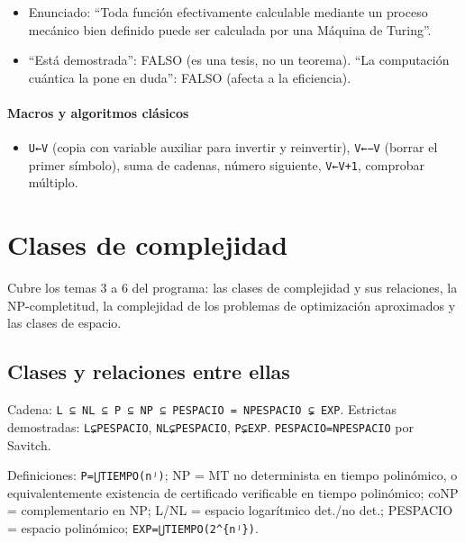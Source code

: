 \documentclass[12pt]{book} %
\providecommand{\tightlist}{%
  \setlength{\itemsep}{0pt}\setlength{\parskip}{0pt}}
\begin{document}
\begin{itemize}
\tightlist
\item
  Enunciado: ``Toda función efectivamente calculable mediante un proceso
  mecánico bien definido puede ser calculada por una Máquina de
  Turing''.
\item
  ``Está demostrada'': FALSO (es una tesis, no un teorema). ``La
  computación cuántica la pone en duda'': FALSO (afecta a la
  eficiencia).
\end{itemize}

\hypertarget{macros-y-algoritmos-cluxe1sicos}{%
\subsubsection{Macros y algoritmos
clásicos}\label{macros-y-algoritmos-cluxe1sicos}}

\begin{itemize}
\tightlist
\item
  \texttt{U←V} (copia con variable auxiliar para invertir y reinvertir),
  \texttt{V←−V} (borrar el primer símbolo), suma de cadenas, número
  siguiente, \texttt{V←V+1}, comprobar múltiplo.
\end{itemize}

\hypertarget{clases-de-complejidad}{%
\chapter{Clases de complejidad}\label{clases-de-complejidad}}

Cubre los temas 3 a 6 del programa: las clases de complejidad y sus
relaciones, la NP-completitud, la complejidad de los problemas de
optimización aproximados y las clases de espacio.

\hypertarget{clases-y-relaciones-entre-ellas}{%
\section{Clases y relaciones entre
ellas}\label{clases-y-relaciones-entre-ellas}}

Cadena:
\texttt{L\ ⊆\ NL\ ⊆\ P\ ⊆\ NP\ ⊆\ PESPACIO\ =\ NPESPACIO\ ⊊\ EXP}.
Estrictas demostradas: \texttt{L⊊PESPACIO}, \texttt{NL⊊PESPACIO},
\texttt{P⊊EXP}. \texttt{PESPACIO=NPESPACIO} por Savitch.

Definiciones: \texttt{P=⋃TIEMPO(nʲ)}; NP = MT no determinista en tiempo
polinómico, o equivalentemente existencia de certificado verificable en
tiempo polinómico; coNP = complementario en NP; L/NL = espacio
logarítmico det./no det.; PESPACIO = espacio polinómico;
\texttt{EXP=⋃TIEMPO(2\^{}\{nʲ\})}.
\end{document}
